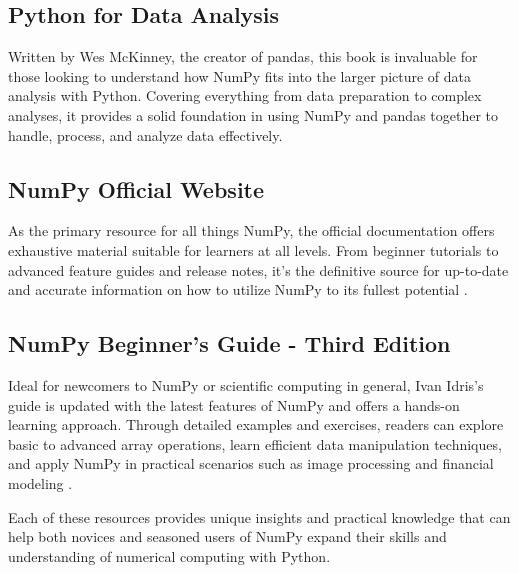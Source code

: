\subsection{Python for Data Analysis}
Written by Wes McKinney, the creator of pandas, this book is invaluable for those looking to understand how NumPy fits into the larger picture of data analysis with Python. Covering everything from data preparation to complex analyses, it provides a solid foundation in using NumPy and pandas together to handle, process, and analyze data effectively.

\subsection{NumPy Official Website}
As the primary resource for all things NumPy, the official documentation offers exhaustive material suitable for learners at all levels. From beginner tutorials to advanced feature guides and release notes, it's the definitive source for up-to-date and accurate information on how to utilize NumPy to its fullest potential \cite{NumPy:2024}.

\subsection{NumPy Beginner's Guide - Third Edition}
Ideal for newcomers to NumPy or scientific computing in general, Ivan Idris’s guide is updated with the latest features of NumPy and offers a hands-on learning approach. Through detailed examples and exercises, readers can explore basic to advanced array operations, learn efficient data manipulation techniques, and apply NumPy in practical scenarios such as image processing and financial modeling \cite{NumPy:2024}.

Each of these resources provides unique insights and practical knowledge that can help both novices and seasoned users of NumPy expand their skills and understanding of numerical computing with Python.

